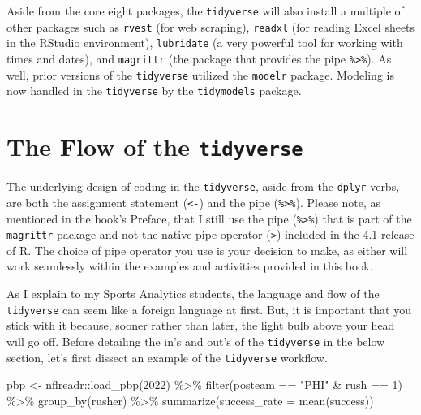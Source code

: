 \documentclass[
  letterpaper,
]{krantz}
\newenvironment{Shaded}{\begin{snugshade}}{\end{snugshade}}
\newcommand{\AttributeTok}[1]{\textcolor[rgb]{0.40,0.45,0.13}{#1}}
\newcommand{\DecValTok}[1]{\textcolor[rgb]{0.68,0.00,0.00}{#1}}
\newcommand{\FunctionTok}[1]{\textcolor[rgb]{0.28,0.35,0.67}{#1}}
\newcommand{\NormalTok}[1]{\textcolor[rgb]{0.00,0.23,0.31}{#1}}
\newcommand{\OtherTok}[1]{\textcolor[rgb]{0.00,0.23,0.31}{#1}}
\newcommand{\SpecialCharTok}[1]{\textcolor[rgb]{0.37,0.37,0.37}{#1}}
\newcommand{\StringTok}[1]{\textcolor[rgb]{0.13,0.47,0.30}{#1}}
\begin{document}
Aside from the core eight packages, the \texttt{tidyverse} will also
install a multiple of other packages such as \texttt{rvest} (for web
scraping), \texttt{readxl} (for reading Excel sheets in the RStudio
environment), \texttt{lubridate} (a very powerful tool for working with
times and dates), and \texttt{magrittr} (the package that provides the
pipe \texttt{\%\textgreater{}\%}). As well, prior versions of the
\texttt{tidyverse} utilized the \texttt{modelr} package. Modeling is now
handled in the \texttt{tidyverse} by the \texttt{tidymodels} package.

\hypertarget{the-flow-of-the-tidyverse}{%
\section{\texorpdfstring{The Flow of the
\texttt{tidyverse}}{The Flow of the tidyverse}}\label{the-flow-of-the-tidyverse}}

The underlying design of coding in the \texttt{tidyverse}, aside from
the \texttt{dplyr} verbs, are both the assignment statement
(\texttt{\textless{}-}) and the pipe (\texttt{\%\textgreater{}\%}).
Please note, as mentioned in the book's Preface, that I still use the
pipe (\texttt{\%\textgreater{}\%}) that is part of the \texttt{magrittr}
package and not the native pipe operator
(\texttt{\textbar{}\textgreater{}}) included in the 4.1 release of R.
The choice of pipe operator you use is your decision to make, as either
will work seamlessly within the examples and activities provided in this
book.

As I explain to my Sports Analytics students, the language and flow of
the \texttt{tidyverse} can seem like a foreign language at first. But,
it is important that you stick with it because, sooner rather than
later, the light bulb above your head will go off. Before detailing the
in's and out's of the \texttt{tidyverse} in the below section, let's
first dissect an example of the \texttt{tidyverse} workflow.

\begin{Shaded}
\begin{Highlighting}[]
\NormalTok{pbp }\OtherTok{\textless{}{-}}\NormalTok{ nflreadr}\SpecialCharTok{::}\FunctionTok{load\_pbp}\NormalTok{(}\DecValTok{2022}\NormalTok{) }\SpecialCharTok{\%\textgreater{}\%}
  \FunctionTok{filter}\NormalTok{(posteam }\SpecialCharTok{==} \StringTok{"PHI"} \SpecialCharTok{\&}\NormalTok{ rush }\SpecialCharTok{==} \DecValTok{1}\NormalTok{) }\SpecialCharTok{\%\textgreater{}\%}
  \FunctionTok{group\_by}\NormalTok{(rusher) }\SpecialCharTok{\%\textgreater{}\%}
  \FunctionTok{summarize}\NormalTok{(}\AttributeTok{success\_rate =} \FunctionTok{mean}\NormalTok{(success))}
\end{Highlighting}
\end{Shaded}
\end{document}
